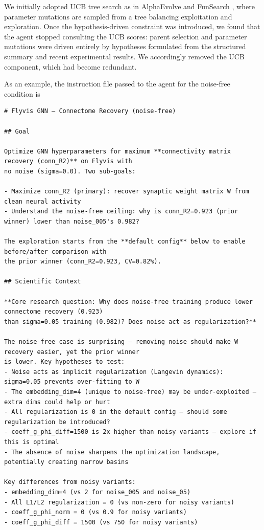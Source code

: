 \documentclass{article}
\begin{document}
We initially adopted UCB tree search as in AlphaEvolve and FunSearch
\citep{romera-paredes_mathematical_2024,novikov_alphaevolve_2025}, where
parameter mutations are sampled from a tree balancing exploitation and
exploration. Once the hypothesis-driven constraint was introduced, we
found that the agent stopped consulting the UCB scores: parent selection and
parameter mutations were driven entirely by hypotheses formulated from the
structured summary and recent experimental results. We accordingly removed
the UCB component, which had become redundant.


\label{app:instruction_file}
As an example, the instruction file passed to the agent for the
noise-free condition is

\begin{tiny}
\begin{verbatim}
# Flyvis GNN — Connectome Recovery (noise-free)

## Goal

Optimize GNN hyperparameters for maximum **connectivity matrix recovery (conn_R2)** on Flyvis with
no noise (sigma=0.0). Two sub-goals:

- Maximize conn_R2 (primary): recover synaptic weight matrix W from clean neural activity
- Understand the noise-free ceiling: why is conn_R2=0.923 (prior winner) lower than noise_005's 0.982?

The exploration starts from the **default config** below to enable before/after comparison with
the prior winner (conn_R2=0.923, CV=0.82%).

## Scientific Context

**Core research question: Why does noise-free training produce lower connectome recovery (0.923)
than sigma=0.05 training (0.982)? Does noise act as regularization?**

The noise-free case is surprising — removing noise should make W recovery easier, yet the prior winner
is lower. Key hypotheses to test:
- Noise acts as implicit regularization (Langevin dynamics): sigma=0.05 prevents over-fitting to W
- The embedding_dim=4 (unique to noise-free) may be under-exploited — extra dims could help or hurt
- All regularization is 0 in the default config — should some regularization be introduced?
- coeff_g_phi_diff=1500 is 2x higher than noisy variants — explore if this is optimal
- The absence of noise sharpens the optimization landscape, potentially creating narrow basins

Key differences from noisy variants:
- embedding_dim=4 (vs 2 for noise_005 and noise_05)
- All L1/L2 regularization = 0 (vs non-zero for noisy variants)
- coeff_g_phi_norm = 0 (vs 0.9 for noisy variants)
- coeff_g_phi_diff = 1500 (vs 750 for noisy variants)


\end{verbatim}
\end{tiny}
\end{document}
